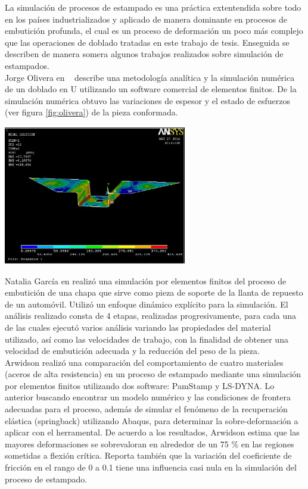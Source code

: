 La simulación de procesos de estampado es una práctica extentendida sobre todo en los países industrializados y 
aplicado de manera dominante en procesos de embutición profunda, el cual es un proceso de deformación un poco 
más complejo que las operaciones de doblado tratadas en este trabajo de tesis. Enseguida se describen de 
manera somera algunos trabajos realizados sobre simulación de estampados.\\

Jorge Olivera en ~\cite{olivera2014} describe una metodología analítica y la simulación numérica de un doblado en U 
utilizando un software comercial de elementos finitos. De la simulación numérica obtuvo las variaciones de espesor 
y el estado de esfuerzos (ver figura \ref{fig:olivera}) de la pieza conformada.

\begin{center}
\includegraphics[width=0.6\textwidth]{src/ch1/olivera.png}
\label{fig:olivera}
\end{center}

Natalia García en \cite{garcia2009} realizó una simulación por elementos finitos del proceso de 
embutición de una chapa que sirve como pieza de soporte de la llanta de repuesto de un automóvil. 
Utilizó un enfoque dinámico explícito para la simulación. El análisis realizado consta 
de 4 etapas, realizadas progresivamente, para cada una de las cuales ejecutó varios análisis 
variando las propiedades del material utilizado, así como las velocidades de trabajo, con la 
finalidad de obtener una velocidad de embutición adecuada y la reducción del peso de la pieza.\\

Arwidson \cite{arwidson2005} realizó una comparación del comportamiento de cuatro materiales (aceros de
alta resistencia) en un proceso de estampado mediante una simulación por elementos finitos
utilizando dos software: PamStamp y LS-DYNA. Lo anterior buscando encontrar un modelo 
numérico y las condiciones de frontera adecuadas para el proceso, además de simular
el fenómeno de la recuperación elástica (springback) utilizando Abaqus, para determinar la
sobre-deformación a aplicar con el herramental. De acuerdo a los resultados, Arwidson estima
que las mayores deformaciones se sobrevaloran en alrededor de un 75 \% en las regiones sometidas 
a flexión crítica. Reporta también que la variación del coeficiente de fricción en el rango 
de 0 a 0.1 tiene una influencia casi nula en la simulación del proceso de estampado.


